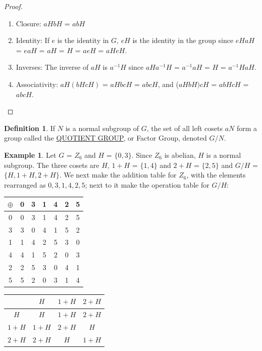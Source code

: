 \documentclass[12pt]{article}
\theoremstyle{definition}
\newtheorem{definition}{Definition}
\newtheorem{example}{Example}
\begin{document}
\begin{proof}
~

  \begin{enumerate}
  \item

  Closure: $aHbH$ = $abH$
  \item

  Identity: If $e$ is the identity in $G$, $eH$ is the identity in the  group since $eHaH$ = $eaH$ = $aH$ = $H$ = $aeH$ = $aH eH$.
  \item

  Inverses: The inverse of $aH$ is $a^{-1}H$ since $aHa^{-1}H$ = $a^{-1}aH$ = $H$ = $a^{-1}HaH$.
  \item

  Associativity: $aH(bHcH)$ = $aHbcH$ = $abcH$, and ($aHbH)cH$ = $abHcH$ = $abcH$.
  \end{enumerate}
 \end{proof}

\begin{definition} If $N$ is a normal subgroup of $G$, the set of all left cosets $aN$ form a group called the \underline{QUOTIENT GROUP}, or Factor Group, denoted $G/N$.
 \end{definition}

\begin{example} Let $G$ = $Z_6$ and $H$ = $\{0,3\}$. Since $Z_6$ is abelian, $H$ is a normal subgroup. The three cosets are $H$, $1+H$ = $\{1,4\}$ and $2+H$ = $\{2,5\}$ and $G/H$ = $\{H, 1+H, 2+H\}$.
    We next make the addition table for $Z_6$, with the elements rearranged as $0, 3, 1, 4, 2, 5$; next to it  make the operation table for $G/H$:
\end{example}


    \begin{center}
        \begin{tabular}{c||cc|cc|cc}
            $\oplus$ & 0 & 3 & 1 & 4 & 2 & 5 \\ \hline\hline
            0 & 0 & 3 & 1 & 4 & 2 & 5 \\
            3 & 3 & 0 & 4 & 1 & 5 & 2 \\ \hline
            1 & 1 & 4 & 2 & 5 & 3 & 0 \\
            4 & 4 & 1 & 5 & 2 & 0 & 3 \\ \hline
            2 & 2 & 5 & 3 & 0 & 4 & 1 \\
            5 & 5 & 2 & 0 & 3 & 1 & 4
        \end{tabular}
        \qquad\qquad
        \begin{tabular}{c | c c c}
             & $H$ & $1+H$ & $2+H$ \\ \hline
         $H$ & $H$ & $1+H$ & $2+H$ \\
         $1+H$ & $1+H$ & $2+H$ & $H$ \\
         $2+H$ & $2+H$ & $H$ & $1+H$
        \end{tabular}
    \end{center}
\end{document}
